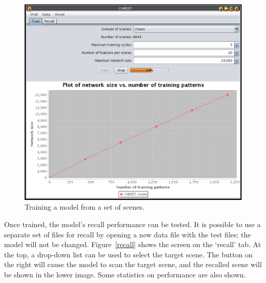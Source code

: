 \documentclass{article}
\begin{document}
\begin{figure}
\includegraphics[width=\textwidth]{images/visual-search.eps}
\caption{Training a model from a set of scenes.}
\label{visual-search}
\end{figure}

Once trained, the model's recall performance can be tested.  It is possible to
use a separate set of files for recall by opening a new data file with the test
files; the model will not be changed.  Figure~\ref{recall} shows the screen on
the `recall' tab.  At the top, a drop-down list can be used to select the
target scene.  The button on the right will cause the model to scan the target
scene, and the recalled scene will be shown in the lower image.  Some
statistics on performance are also shown.
\end{document}
